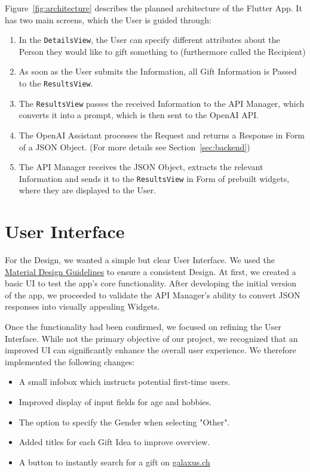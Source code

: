 Figure~\ref{fig:architecture} describes the planned architecture of the Flutter App. It has two main screens, which the User is guided through:
\begin{enumerate}
	\item In the \texttt{DetailsView}, the User can specify different attributes about the Person they would like to gift something to (furthermore called the Recipient)
	\item As soon as the User submits the Information, all Gift Information is Passed to the \texttt{ResultsView}.
	\item The \texttt{ResultsView} passes the received Information to the API Manager, which converts it into a prompt, which is then sent to the OpenAI API.
	\item The OpenAI Assistant processes the Request and returns a Response in Form of a JSON Object. (For more details see Section~\ref{sec:backend})
	\item The API Manager receives the JSON Object, extracts the relevant Information and sends it to the \texttt{ResultsView} in Form of prebuilt widgets, where they are displayed to the User.
\end{enumerate}

\section*{User Interface}

For the Design, we wanted a simple but clear User Interface. We used the \href{https://m3.material.io/}{Material Design Guidelines} to ensure a consistent Design. At first, we created a basic UI to test the app's core functionality. After developing the initial version of the app, we proceeded to validate the API Manager's ability to convert JSON responses into visually appealing Widgets.

Once the functionality had been confirmed, we focused on refining the User Interface. While not the primary objective of our project, we recognized that an improved UI can significantly enhance the overall user experience. We therefore implemented the following changes:

\begin{itemize}
\item A small infobox which instructs potential first-time users.
\item Improved display of input fields for age and hobbies.
\item The option to specify the Gender when selecting "Other".
\item Added titles for each Gift Idea to improve overview.
\item A button to instantly search for a gift on \url{galaxus.ch}
\end{itemize}

